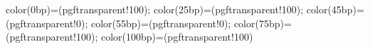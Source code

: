 \newdimen\ys@frame@linewidth
\newdimen\ys@frame@radius
\newdimen\ys@frame@sep

{color(0bp)=(pgftransparent!100); color(25bp)=(pgftransparent!100);
color(45bp)=(pgftransparent!0); color(55bp)=(pgftransparent!0);
color(75bp)=(pgftransparent!100); color(100bp)=(pgftransparent!100)}

\def\ys@frame@star@list@t{%
  -0.7071\ys@frame@radius+0.2133\ys@frame@sep/%
    -0.7071\ys@frame@radius+0.2133\ys@frame@sep/%
    frame.north east,%
  0.7071\ys@frame@radius-0.2133\ys@frame@sep/%
    -0.7071\ys@frame@radius+0.2133\ys@frame@sep/%
    frame.north west}
\def\ys@frame@star@list@b{%
  0.7071\ys@frame@radius-0.2133\ys@frame@sep/%
    0.7071\ys@frame@radius-0.2133\ys@frame@sep/%
    frame.south west,%
  -0.7071\ys@frame@radius+0.2133\ys@frame@sep/%
    0.7071\ys@frame@radius-0.2133\ys@frame@sep/%
    frame.south east}
\edef\ys@frame@star@list{\ys@frame@star@list@t,\ys@frame@star@list@b}

